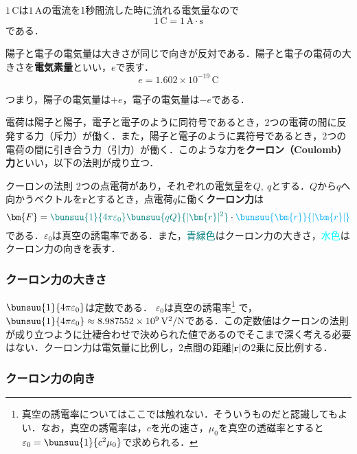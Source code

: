 $1\,\mathrm{C}$は$1\,\mathrm{A}$の電流を1秒間流した時に流れる電気量なので
\begin{equation}
	1\,\mathrm{C} = 1\,\mathrm{A \cdot s}
\end{equation}
である．

陽子と電子の電気量は大きさが同じで向きが反対である．陽子と電子の電荷の大きさを\textbf{電気素量}といい，$e$で表す．
\begin{equation}
	e = 1.602 \times 10^{-19}\,\mathrm{C}
\end{equation}

つまり，陽子の電気量は$+e$，電子の電気量は$-e$である．

電荷は陽子と陽子，電子と電子のように同符号であるとき，2つの電荷の間に反発する力（斥力）が働く．また，陽子と電子のように異符号であるとき，2つの電荷の間に引き合う力（引力）が働く．このような力を\textbf{クーロン（Coulomb）力}といい，以下の法則が成り立つ．

\begin{kousiki}{クーロンの法則}
	2つの点電荷があり，それぞれの電気量を$Q,\ q$とする．$Q$から$q$へ向かうベクトルを$\bm{r}$とするとき，点電荷$q$に働く\textbf{クーロン力}は
	\begin{equation}
		\bm{F} = {\color{teal}
			\bunsuu{1}{4\pi \varepsilon_0}\bunsuu{qQ}{|\bm{r}|^2}
		}
		\cdot 
		{\color{cyan}
			\bunsuu{\bm{r}}{|\bm{r}|}
		}
	\end{equation}
	である．$\varepsilon_0$は真空の誘電率である．また，\textcolor{teal}{青緑色}はクーロン力の大きさ，\textcolor{cyan}{水色}はクーロン力の向きを表す．
\end{kousiki}



\subsubsection*{クーロン力の大きさ}

$\bunsuu{1}{4\pi\varepsilon_0}$は定数である．
$\varepsilon_0$は真空の誘電率\footnote{真空の誘電率についてはここでは触れない．そういうものだと認識してもよい．なお，真空の誘電率は，$c$を光の速さ，$\mu_0$を真空の透磁率とすると$\varepsilon_0 = \bunsuu{1}{c^2\mu_0}$で求められる．} で，
$\bunsuu{1}{4\pi\varepsilon_0} \approx 8.987552 \times 10^9\, \mathrm{V^2 / N}$である．この定数値はクーロンの法則が成り立つように辻褄合わせで決められた値であるのでそこまで深く考える必要はない．クーロン力は電気量に比例し，2点間の距離$|\bm{r}|$の2乗に反比例する．



\subsubsection*{クーロン力の向き}

